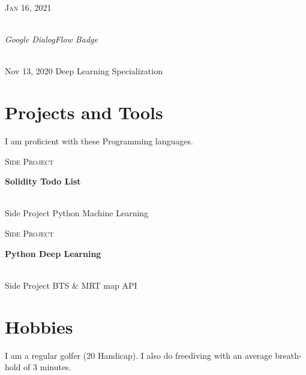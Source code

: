 \documentclass[letterpaper, 10pt]{article}
\let\oldhref\href
\renewcommand{\href}[3][blue]{\oldhref{#2}{\color{#1}{#3}}}
\newcommand{\entry}[4]{
    \begin{minipage}[t]{.15 \linewidth}
        \hfill \textsc{#1}
    \end{minipage}
    \hfill \vline \hfill
    \begin{minipage}[t]{.80 \linewidth}
        {\bf#2} \\ \textit{#3} \footnotesize{#4}
    \end{minipage} \\
    \vspace{.2cm}
}%
\begin{document}
\entry{Jan 16, 2021}
    {\href{https://google.dev/badges/playlists/cloud/chatbots-dialogflow?fbclid=IwAR14_zV_bqZt2BOeaxsyfpQGaZTYYakseBRubgepLQ5E3je0KqlEfJWHYR0}{Google-DialogFlow}}
    {Google DialogFlow Badge}


\entry{Nov 13, 2020}
    {\href{https://www.coursera.org/account/accomplishments/specialization/certificate/KPATQ89DEUJC}{Coursera-DeepLearning}}
    {Deep Learning Specialization}

\section{Projects and Tools}

I am proficient with these Programming languages. \\

\entry{Side Project}
    {Solidity Todo List}
    {\href{https://github.com/narula2000/SolidityTodoList.git}{Github}}


\entry{Side Project}
    {Python Machine Learning}
    {\href{https://github.com/narula2000/SteamReviewAnalysisMLProject.git}{Github}}


\entry{Side Project}
    {Python Deep Learning}
    {\href{https://www.kaggle.com/vikromnarula/pix2pix}{Kaggle}}


\entry{Side Project}
    {BTS \& MRT map API}
    {\href{https://github.com/narula2000/BTS-MRT-Transportation-API}{Github}}

\section{Hobbies}

I am a regular golfer (20 Handicap). I also do freediving with an average breath-hold of 3 minutes.
\end{document}
